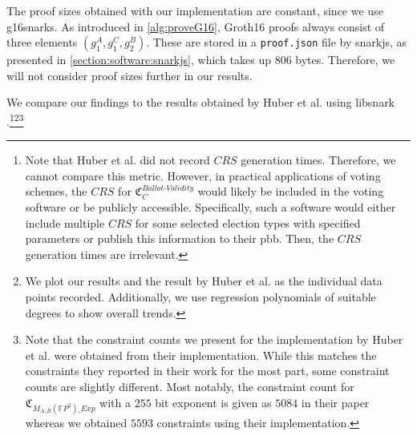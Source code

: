 
The proof sizes obtained with our implementation are constant, since we use \glspl{g16snark}.
As introduced in \cref{alg:proveG16}, Groth16 proofs always consist of three elements $(g_1^A,g_1^C,g_2^B)$.
These are stored in a \verb|proof.json| file by snarkjs, as presented in \cref{section:software:snarkjs}, which takes up $806$ bytes.
Therefore, we will not consider proof sizes further in our results.

We compare our findings to the results obtained by Huber et al. using libsnark \cite{huber_zk-snarks_2025}.\footnote{
    \label{footnote:noCompForCRSGenerationTimes}
    Note that Huber et al. did not record $CRS$ generation times.
    Therefore, we cannot compare this metric.
    However, in practical applications of voting schemes, the $CRS$ for $\mathfrak{C}_{C}^{Ballot\text{-}Validity}$ would likely be included in the voting software or be publicly accessible.
    Specifically, such a software would either include multiple $CRS$ for some selected election types with specified parameters or publish this information to their \gls{pbb}.
    Then, the $CRS$ generation times are irrelevant.
}\footnote{
    \label{footnote:plottingMethod}
    We plot our results and the result by Huber et al. as the individual data points recorded.
    Additionally, we use regression polynomials of suitable degrees to show overall trends.
}\footnote{
    \label{footnote:resultsFromImplementation}
    Note that the constraint counts we present for the implementation by Huber et al. were obtained from their implementation.
    While this matches the constraints they reported in their work for the most part, some constraint counts are slightly different.
    Most notably, the constraint count for $\mathfrak{C}_{M_{A,B}(\mathbb{F}P^2)\_Exp}$ with a $255$ bit exponent is given as $5084$ in their paper whereas we obtained $5593$ constraints using their implementation.
}

